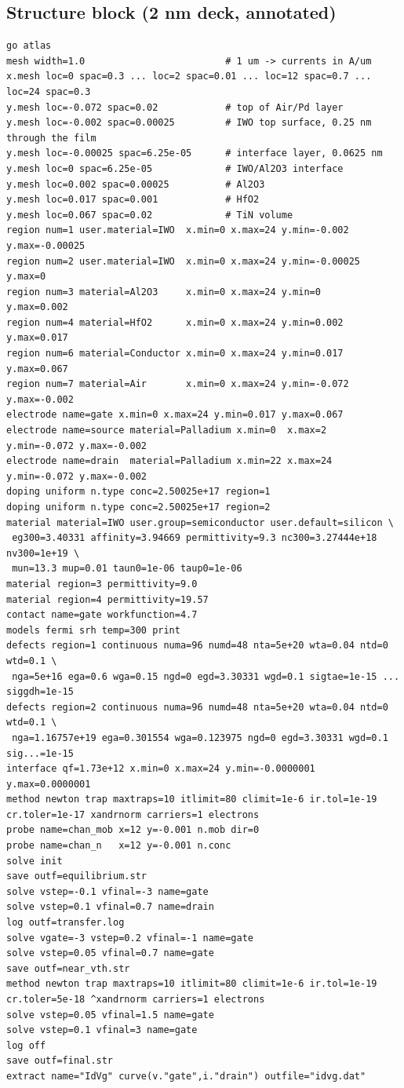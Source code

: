 \documentclass[11pt,a4paper]{article}
\begin{document}
\subsection{Structure block (2 nm deck, annotated)}
\begin{lstlisting}
go atlas
mesh width=1.0                         # 1 um -> currents in A/um
x.mesh loc=0 spac=0.3 ... loc=2 spac=0.01 ... loc=12 spac=0.7 ... loc=24 spac=0.3
y.mesh loc=-0.072 spac=0.02            # top of Air/Pd layer
y.mesh loc=-0.002 spac=0.00025         # IWO top surface, 0.25 nm through the film
y.mesh loc=-0.00025 spac=6.25e-05      # interface layer, 0.0625 nm
y.mesh loc=0 spac=6.25e-05             # IWO/Al2O3 interface
y.mesh loc=0.002 spac=0.00025          # Al2O3
y.mesh loc=0.017 spac=0.001            # HfO2
y.mesh loc=0.067 spac=0.02             # TiN volume
region num=1 user.material=IWO  x.min=0 x.max=24 y.min=-0.002   y.max=-0.00025
region num=2 user.material=IWO  x.min=0 x.max=24 y.min=-0.00025 y.max=0
region num=3 material=Al2O3     x.min=0 x.max=24 y.min=0        y.max=0.002
region num=4 material=HfO2      x.min=0 x.max=24 y.min=0.002    y.max=0.017
region num=6 material=Conductor x.min=0 x.max=24 y.min=0.017    y.max=0.067
region num=7 material=Air       x.min=0 x.max=24 y.min=-0.072   y.max=-0.002
electrode name=gate x.min=0 x.max=24 y.min=0.017 y.max=0.067
electrode name=source material=Palladium x.min=0  x.max=2  y.min=-0.072 y.max=-0.002
electrode name=drain  material=Palladium x.min=22 x.max=24 y.min=-0.072 y.max=-0.002
doping uniform n.type conc=2.50025e+17 region=1
doping uniform n.type conc=2.50025e+17 region=2
material material=IWO user.group=semiconductor user.default=silicon \
 eg300=3.40331 affinity=3.94669 permittivity=9.3 nc300=3.27444e+18 nv300=1e+19 \
 mun=13.3 mup=0.01 taun0=1e-06 taup0=1e-06
material region=3 permittivity=9.0
material region=4 permittivity=19.57
contact name=gate workfunction=4.7
models fermi srh temp=300 print
defects region=1 continuous numa=96 numd=48 nta=5e+20 wta=0.04 ntd=0 wtd=0.1 \
 nga=5e+16 ega=0.6 wga=0.15 ngd=0 egd=3.30331 wgd=0.1 sigtae=1e-15 ... siggdh=1e-15
defects region=2 continuous numa=96 numd=48 nta=5e+20 wta=0.04 ntd=0 wtd=0.1 \
 nga=1.16757e+19 ega=0.301554 wga=0.123975 ngd=0 egd=3.30331 wgd=0.1 sig...=1e-15
interface qf=1.73e+12 x.min=0 x.max=24 y.min=-0.0000001 y.max=0.0000001
method newton trap maxtraps=10 itlimit=80 climit=1e-6 ir.tol=1e-19 cr.toler=1e-17 xandrnorm carriers=1 electrons
probe name=chan_mob x=12 y=-0.001 n.mob dir=0
probe name=chan_n   x=12 y=-0.001 n.conc
solve init
save outf=equilibrium.str
solve vstep=-0.1 vfinal=-3 name=gate
solve vstep=0.1 vfinal=0.7 name=drain
log outf=transfer.log
solve vgate=-3 vstep=0.2 vfinal=-1 name=gate
solve vstep=0.05 vfinal=0.7 name=gate
save outf=near_vth.str
method newton trap maxtraps=10 itlimit=80 climit=1e-6 ir.tol=1e-19 cr.toler=5e-18 ^xandrnorm carriers=1 electrons
solve vstep=0.05 vfinal=1.5 name=gate
solve vstep=0.1 vfinal=3 name=gate
log off
save outf=final.str
extract name="IdVg" curve(v."gate",i."drain") outfile="idvg.dat"
\end{lstlisting}
\end{document}
